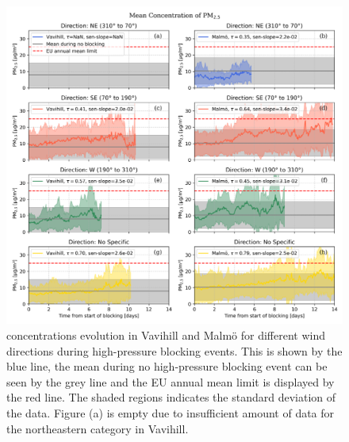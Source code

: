 \begin{figure}[H]
    \centering
    \includegraphics[width=\textwidth]{Figures/Meanplot_dir.png}
    \caption{\PM concentrations evolution in Vavihill and Malmö for different wind directions during high-pressure blocking events. This is shown by the blue line, the mean during no high-pressure blocking event can be seen by the grey line and the EU annual mean limit is displayed by the red line. The shaded regions indicates the standard deviation of the data. Figure (a) is empty due to insufficient amount of data for the northeastern category in Vavihill. }
    \label{fig:Meanplot_wind}
\end{figure}



